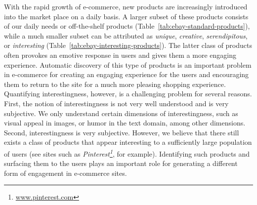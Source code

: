 


With the rapid growth of e-commerce, new products are increasingly introduced into the market place on a daily basis.  A larger subset of these products consists of our daily needs or off-the-shelf products (Table~\ref{tab:ebay-standard-products}), while a much smaller subset can be attributed as {\em unique}, {\em creative}, {\em serendipitous}, or {\em interesting} (Table~\ref{tab:ebay-interesting-products}). The latter class of products often provokes an emotive response in users and gives them a more engaging experience. Automatic discovery of this type of products is an important problem in e-commerce for creating an engaging experience for the users and encouraging them to return to the site for a much more pleasing shopping experience. Quantifying interestingness, however,  is a challenging problem for several reasons. First, the notion of interestingness is not very well understood and is very subjective. We only understand certain dimensions of interestingness, such as visual appeal in images, or humor in the text domain, among other dimensions. Second, interestingness is very subjective. However, we believe that there still exists a class of products that appear interesting to a sufficiently large population of users (see sites such as {\em Pinterest\footnote{\url{www.pinterest.com}}}, for example). Identifying such products and surfacing them to the users plays an important role for generating a different form of engagement in e-commerce sites. 

